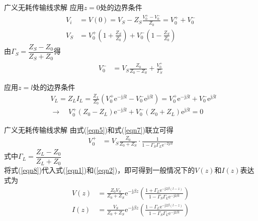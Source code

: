 \begin{frame}{广义无耗传输线求解}
  应用$z=0$处的边界条件
  \begin{align}
    V_i&=V(0)=V_S-Z_S\frac{V_0^+ - V_0^-}{Z_0}=V_0^+ + V_0^-  \\
    V_S&=V_0^+\left( 1+\frac{Z_S}{Z_0}\right) + V_0^-\left( 1-\frac{Z_S}{Z_0}\right)
  \end{align}
  由$\Gamma_S=\dfrac{Z_S-Z_0}{Z_S+Z_0}$得\\
  \begin{align}
    V_0^-&=V_S\frac{Z_0}{Z_0-Z_S}+\frac{V_0^+}{\Gamma_S}\label{eqn5}  
  \end{align}  
  
  应用$z=l$处的边界条件
  \begin{align}
    &V_L=Z_LI_L=\frac{Z_L}{Z_0}(V_0^+\mathrm{e}^{-\mathrm{j}\beta l}-V_0^-\mathrm{e}^{\mathrm{j}\beta l})=V_0^+\mathrm{e}^{-\mathrm{j}\beta l}+V_0^-\mathrm{e}^{\mathrm{j}\beta l}\\
    &\rightarrow \quad V_0^+(Z_0-Z_L)\mathrm{e}^{-\mathrm{j}\beta l}+V_0^-(Z_0+Z_L)\mathrm{e}^{\mathrm{j}\beta l}=0\label{eqn7}
  \end{align}
\end{frame}

\begin{frame}{广义无耗传输线求解}
  由式(\ref{eqn5})和式(\ref{eqn7})联立可得
  \begin{align}
    V_0^+&=V_S\frac{Z_0}{Z_0+Z_S}\cdot\frac{1}{1-\Gamma_S\Gamma_L\mathrm{e}^{-2\mathrm{j}\beta l}}\label{eqn8}
  \end{align}
  式中$\Gamma_L=\dfrac{Z_L-Z_0}{Z_L+Z_0}$\\
  将式(\ref{eqn8})代入式(\ref{eqn1})和(\ref{eqn2})，即可得到一般情况下的$V(z)$和$I(z)$表达式为
  \begin{align}
    V(z)&=\frac{Z_0V_S}{Z_0+Z_S}\mathrm{e}^{-\mathrm{j}\beta z}\left(\frac{1+\Gamma_L\mathrm{e}^{-\mathrm{j}2\beta(l-z)}}{1-\Gamma_S\Gamma_L\mathrm{e}^{-\mathrm{j}2\beta l}}\right)\label{eqn9}\\
    I(z)&=\frac{V_S}{Z_0+Z_S}\mathrm{e}^{-\mathrm{j}\beta z}\left(\frac{1-\Gamma_L\mathrm{e}^{-\mathrm{j}2\beta(l-z)}}{1-\Gamma_S\Gamma_L\mathrm{e}^{-\mathrm{j}2\beta l}}\right)\label{eqn10}
  \end{align}
\end{frame}

